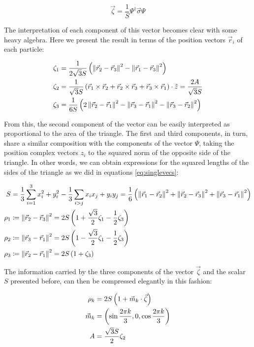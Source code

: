 \begin{equation}
\vec{\zeta} = \frac{1}{S} \Psi^{\dagger}\vec{\sigma}\Psi
\end{equation}

The interpretation of each component of this vector becomes clear with some heavy algebra. Here we present the result in terms of the position vectors $ \vec{r}_i $ of each particle:

\begin{align*}
\zeta_1 &= \frac{1}{2\sqrt{3}S}\left( \left\lVert \vec{r}_2 -\vec{r}_3 \right\rVert^2-\left\lVert \vec{r}_1 -\vec{r}_3 \right\rVert^2 \right)\\
\zeta_2 &= \frac{1}{\sqrt{3}S}\left( \vec{r}_1\times\vec{r}_2 + \vec{r}_2\times\vec{r}_3 +\vec{r}_3\times\vec{r}_1 \right)\cdot\hat{z} = \frac{2A}{\sqrt{3}S} \\
\zeta_3 &= \frac{1}{6S}\left( 2\left\lVert \vec{r}_2 -\vec{r}_1 \right\rVert^2-\left\lVert \vec{r}_3 -\vec{r}_1 \right\rVert^2-\left\lVert \vec{r}_3 -\vec{r}_2 \right\rVert^2 \right)\\
\end{align*}

From this, the second component of the vector can be easily interpreted as proportional to the area of the triangle. The first and third components, in turn, share a similar composition with the components of the vector $\Psi$, taking the position complex vectors $z_i$ to the squared norm of the opposite side of the triangle. In other words, we can obtain expressions for the squared lengths of the sides of the triangle as we did in equations \eqref{eq:singlevecs}:

\begin{align*}
S &= \frac{1}{3}\sum_{i=1}^3 x_i^2 + y_i^2 -\frac{1}{3}\sum_{i > j} x_ix_j + y_iy_j  = \frac{1}{6}\left( \left\lVert \vec{r}_1 -\vec{r}_2 \right\rVert^2+\left\lVert \vec{r}_2 -\vec{r}_3 \right\rVert^2+\left\lVert \vec{r}_3 -\vec{r}_1 \right\rVert^2 \right)\\
\rho_1 &\coloneqq \left\lVert \vec{r}_2 -\vec{r}_3 \right\rVert^2 = 2S\left( 1+\frac{\sqrt{3}}{2}\zeta_1-\frac{1}{2}\zeta_3 \right) \\
\rho_2 &\coloneqq \left\lVert \vec{r}_3 -\vec{r}_1 \right\rVert^2 = 2S\left( 1-\frac{\sqrt{3}}{2}\zeta_1-\frac{1}{2}\zeta_3 \right) \\
\rho_3 &\coloneqq \left\lVert \vec{r}_2 -\vec{r}_1 \right\rVert^2 = 2S\left( 1+\zeta_3 \right)
\end{align*}

The information carried by the three components of the vector $\vec{\zeta}$ and the scalar $S$ presented before, can then be compressed elegantly in this fashion:

\begin{align*}
\rho_k &= 2S\left( 1+\vec{m}_k\cdot\vec{\zeta} \right)\\
\vec{m}_k &= \left( \sin{\frac{2\pi k}{3}},0,\cos{\frac{2\pi k}{3}} \right)\\
A &= \frac{\sqrt{3}S}{2} \zeta_2
\end{align*}









